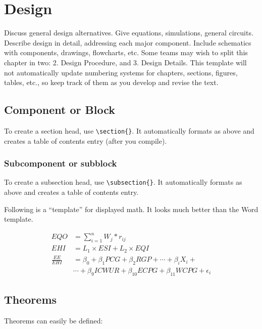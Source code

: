 \chapter{Design}
Discuss general design alternatives. Give equations, simulations, general circuits. Describe design in detail, addressing each major component. Include schematics with components, drawings, flowcharts, etc. Some teams may wish to split this chapter in two: 2. Design Procedure, and 3. Design Details. This template will not automatically update numbering systems for chapters, sections, figures, tables, etc., so keep track of them as you develop and revise the text.

\section{Component or Block}
To create a section head, use \verb|\section{}|. It automatically formats as above and creates a table of contents entry (after you compile).

\subsection{Subcomponent or subblock}
To create a subsection head, use \verb|\subsection{}|. It automatically formats as above and creates a table of contents entry.

Following is a “template” for displayed math. It looks much better than the Word template.

\begin{align}
    EQO            & = \sum_{i=1}^n W_j * r_{ij}                                           \\
    EHI            & = L_1 \times ESI + L_2 \times EQI                                     \\
    \frac{EE}{EHI} & = \beta_0 + \beta_1 PCG + \beta_2 RGP + \cdots + \beta_i X_i +        \\
                   & \cdots + \beta_9 ICWUR + \beta_{10} ECPG + \beta_11 WCPG + \epsilon_i
\end{align}

\section{Theorems}
Theorems can easily be defined:

